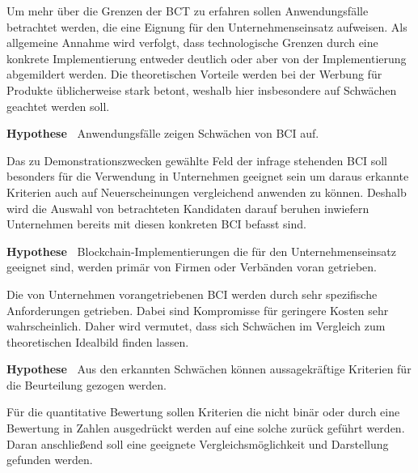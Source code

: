 Um mehr über die Grenzen der \gls{BCT} zu erfahren sollen Anwendungsfälle betrachtet werden, die eine Eignung für den Unternehmenseinsatz aufweisen.
Als allgemeine Annahme wird verfolgt, dass technologische Grenzen durch eine konkrete Implementierung entweder deutlich oder aber von der Implementierung abgemildert werden.
Die theoretischen Vorteile werden bei der Werbung für Produkte üblicherweise stark betont, weshalb hier insbesondere auf Schwächen geachtet werden soll.

\textbf{Hypothese~} Anwendungsfälle zeigen Schwächen von \gls{BCI} auf.

Das zu Demonstrationszwecken gewählte Feld der infrage stehenden \gls{BCI} soll besonders für die Verwendung in Unternehmen geeignet sein um daraus erkannte Kriterien auch auf Neuerscheinungen vergleichend anwenden zu können.
Deshalb wird die Auswahl von betrachteten Kandidaten darauf beruhen inwiefern Unternehmen bereits mit diesen konkreten \gls{BCI} befasst sind.

\textbf{Hypothese~} Blockchain-Implementierungen die für den Unternehmenseinsatz geeignet sind, werden primär von Firmen oder Verbänden voran getrieben.

Die von Unternehmen vorangetriebenen \gls{BCI} werden durch sehr spezifische Anforderungen getrieben.
Dabei sind Kompromisse für geringere Kosten sehr wahrscheinlich.
Daher wird vermutet, dass sich Schwächen im Vergleich zum theoretischen Idealbild finden lassen.

\textbf{Hypothese~} Aus den erkannten Schwächen können aussagekräftige Kriterien für die Beurteilung gezogen werden.

Für die quantitative Bewertung sollen Kriterien die nicht binär oder durch eine Bewertung in Zahlen ausgedrückt werden auf eine solche zurück geführt werden.
Daran anschließend soll eine geeignete Vergleichsmöglichkeit und Darstellung gefunden werden.



